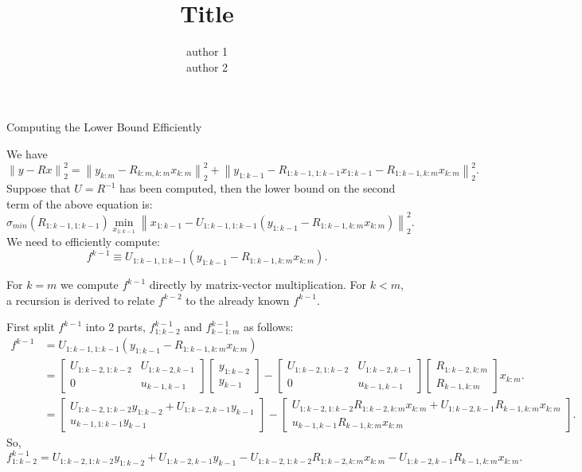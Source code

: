 \documentclass[11pt]{article}	%
\author{author 1\\ author 2}
\title{Title}
\numberwithin{algorithm}{section}
\begin{document}

\begin{center}\begin{large}Computing the Lower Bound Efficiently \end{large}\end{center}

We have 
\begin{equation*}
 \left \| y - Rx \right \|^2_2 = \left \| y_{k:m}- R_{k:m,k:m}x_{k:m} \right \|^2_2 + \left \| y_{1:k-1} - R_{1:k-1,1:k-1}x_{1:k-1} - R_{1:k-1,k:m}x_{k:m} \right \|^2_2.
\end{equation*}
Suppose that $U = R^{-1}$ has been computed, then the lower bound on the second term of the above equation is:
\begin{equation*}
\sigma_{min}(R_{1:k-1,1:k-1}) \min_{x_{1:k-1}}\left \| x_{1:k-1} - U_{1:k-1,1:k-1}(y_{1:k-1}-R_{1:k-1,k:m}x_{k:m}) \right \|_2^2.
\end{equation*}
We need to efficiently compute:
\begin{equation}
f^{k-1} \equiv U_{1:k-1,1:k-1}(y_{1:k-1}-R_{1:k-1,k:m}x_{k:m}).
\end{equation}

For $k=m$ we compute $f^{k-1}$ directly by matrix-vector multiplication.
For $k < m$, a recursion is derived to relate $f^{k-2}$ to the already known $f^{k-1}$.

First split $f^{k-1}$ into 2 parts, $f^{k-1}_{1:k-2}$ and $f^{k-1}_{k-1:m}$ as follows:
\begin{align*}
f^{k-1} &= U_{1:k-1,1:k-1}(y_{1:k-1}-R_{1:k-1,k:m}x_{k:m})
\\
&=\begin{bmatrix}U_{1:k-2,1:k-2} & U_{1:k-2,k-1}\\ 0 & u_{k-1,k-1} \end{bmatrix} 
\begin{bmatrix} y_{1:k-2} \\ y_{k-1} \end{bmatrix} 
- \begin{bmatrix}U_{1:k-2,1:k-2} & U_{1:k-2,k-1}\\ 0 & u_{k-1,k-1} \end{bmatrix} 
\begin{bmatrix}R_{1:k-2,k:m}\\ R_{k-1,k:m} \end{bmatrix}x_{k:m}.
\\
&=\begin{bmatrix}U_{1:k-2,1:k-2}y_{1:k-2}+U_{1:k-2,k-1}y_{k-1}\\ u_{k-1,1:k-1}y_{k-1}\end{bmatrix} -
\begin{bmatrix}U_{1:k-2,1:k-2}R_{1:k-2,k:m}x_{k:m} + U_{1:k-2,k-1}R_{k-1,k:m}x_{k:m}\\ u_{k-1,k-1}R_{k-1,k:m}x_{k:m} \end{bmatrix}.
\end{align*}
So,
\begin{equation}
f^{k-1}_{1:k-2} = U_{1:k-2,1:k-2}y_{1:k-2}+U_{1:k-2,k-1}y_{k-1} - U_{1:k-2,1:k-2}R_{1:k-2,k:m}x_{k:m} - U_{1:k-2,k-1}R_{k-1,k:m}x_{k:m}.
\label{eq:fkm1km2}
\end{equation}
\end{document}
